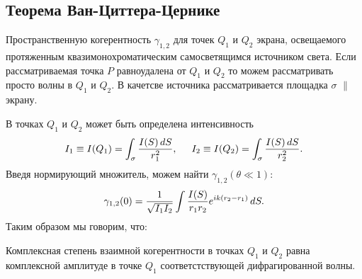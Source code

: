 \subsection{Теорема Ван-Циттера-Цернике}

Пространственную когерентность $\gamma_{1, 2}$ для точек $Q_1$ и $Q_2$ экрана, освещаемого протяженным квазимонохроматическим самосветящимся источником света. Если рассматриваемая точка $P$ равноудалена от $Q_1$ и $Q_2$ то можем рассматривать просто волны в $Q_1$ и $Q_2$. В качетсве источника рассматривается площадка $\sigma$ $\parallel$ экрану. 


В точках $Q_1$ и $Q_2$ может быть определена интенсивность
\begin{equation*}
    I_1 \equiv I(Q_1) = \int_\sigma \frac{I(S) \, d S}{r_1^2}, \hspace{5 mm} 
    I_2 \equiv I(Q_2) = \int_\sigma \frac{I(S) \, d S}{r_2^2}.
\end{equation*}
Введя нормирующий множитель, можем найти $\gamma_{1,2} (\theta \ll 1)$:
\begin{equation*}
    \gamma_{1,2} (0) = \frac{1}{\sqrt{I_1 I_2}} \int \frac{I(S)}{r_1 r_2} e^{ik (r_2-r_1)} \, d S.
\end{equation*}
Таким образом мы говорим, что:

\begin{to_thr}
    Комплексная степень взаимной когерентности в точках $Q_1$ и $Q_2$ равна комплексной амплитуде в точке $Q_1$ соответстствующей дифрагированной волны.
\end{to_thr}